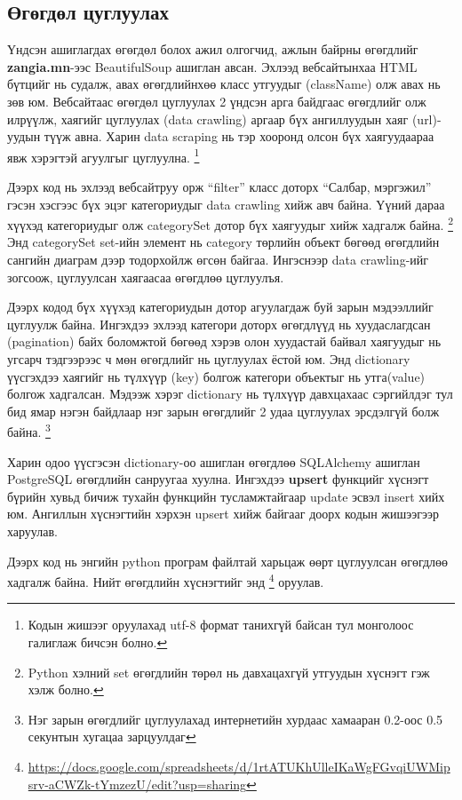 \subsection{Өгөгдөл цуглуулах}
Үндсэн ашиглагдах өгөгдөл болох ажил олгогчид, ажлын байрны өгөгдлийг \textbf{zangia.mn}-ээс BeautifulSoup ашиглан авсан. Эхлээд вебсайтынхаа HTML бүтцийг нь судалж, авах өгөгдлийнхөө класс утгуудыг (className) олж авах нь зөв юм. Вебсайтаас өгөгдөл цуглуулах 2 үндсэн арга байдгаас өгөгдлийг олж илрүүлж, хаягийг цуглуулах (data crawling) аргаар бүх ангиллуудын хаяг (url)-уудын түүж авна. Харин data scraping нь тэр хооронд олсон бүх хаягуудаараа явж хэрэгтэй агуулгыг цуглуулна. \footnote{Кодын жишээг оруулахад utf-8 формат танихгүй байсан тул монголоос галиглаж бичсэн болно.}

Дээрх код нь эхлээд вебсайтруу орж ``filter'' класс доторх ``Салбар, мэргэжил'' гэсэн хэсгээс бүх эцэг категориудыг data crawling хийж авч байна. Үүний дараа хүүхэд категориудыг олж categorySet дотор бүх хаягуудыг хийж хадгалж байна. \footnote{Python хэлний set өгөгдлийн төрөл нь давхацахгүй утгуудын хүснэгт гэж хэлж болно. } Энд categorySet set-ийн элемент нь category төрлийн объект бөгөөд өгөгдлийн сангийн диаграм дээр тодорхойлж өгсөн байгаа. Ингэснээр data crawling-ийг зогсоож, цуглуулсан хаягаасаа өгөгдлөө цуглуулъя.  

Дээрх кодод бүх хүүхэд категориудын дотор агуулагдаж буй зарын мэдээллийг цуглуулж байна. Ингэхдээ эхлээд категори доторх өгөгдлүүд нь хуудаслагдсан (pagination) байх боломжтой бөгөөд хэрэв олон хуудастай байвал хаягуудыг нь угсарч тэдгээрээс ч мөн өгөгдлийг нь цуглуулах ёстой юм. 
Энд dictionary үүсгэхдээ хаягийг нь түлхүүр (key) болгож категори объектыг нь утга(value) болгож хадгалсан. Мэдээж хэрэг dictionary нь түлхүүр давхцахаас сэргийлдэг тул бид ямар нэгэн байдлаар нэг зарын өгөгдлийг 2 удаа цуглуулах эрсдэлгүй болж байна. \footnote{Нэг зарын өгөгдлийг цуглуулахад интернетийн хурдаас хамааран 0.2-оос 0.5 секунтын хугацаа зарцуулдаг}

Харин одоо үүсгэсэн dictionary-оо ашиглан өгөгдлөө SQLAlchemy ашиглан PostgreSQL өгөгдлийн санруугаа хуулна. Ингэхдээ \textbf{upsert} функцийг хүснэгт бүрийн хувьд бичиж тухайн функцийн тусламжтайгаар update эсвэл insert хийх юм. Ангиллын хүснэгтийн хэрхэн upsert хийж байгааг доорх кодын жишээгээр харуулав. 

Дээрх код нь энгийн python програм файлтай харьцаж өөрт цуглуулсан өгөгдлөө хадгалж байна. Нийт өгөгдлийн хүснэгтийг энд \footnote{\url{https://docs.google.com/spreadsheets/d/1rtATUKhUlleIKaWgFGvqiUWMipsrv-aCWZk-tYmzezU/edit?usp=sharing}} оруулав.

